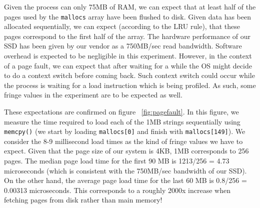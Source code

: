 Given the process can only 75MB of RAM, we can expect that at least half of the pages used by the \texttt{mallocs} array have been flushed to disk. Given data has been allocated sequentially, we can expect (according to the LRU rule), that these pages correspond to the first half of the array. The hardware performance of our SSD has been given by our vendor as a 750MB/sec read bandwidth. Software overhead is expected to be negligible in this experiment. However, in the context of a page fault, we can expect that after waiting for a while the OS might decide to do a context switch before coming back. Such context switch could occur while the process is waiting for a load instruction which is being profiled. As such, some fringe values in the experiment are to be expected as well.

These expectations are confirmed on figure ~\ref{fig:pagefault}. In this figure, we measure the time required to load each of the 1MB strings sequentially using \texttt{memcpy()} (we start by loading \texttt{mallocs[0]} and finish with \texttt{mallocs[149]}). We consider the 8-9 millisecond load times as the kind of fringe values we have to expect.
Given that the page size of our system is 4KB, 1MB corresponds to 256 pages. The median page load time for the first 90 MB is 1213/256 = 4.73  microseconds (which is consistent with the 750MB/sec bandwidth of our SSD). On the other hand, the average page load time for the last 60 MB is 0.8/256 = 0.00313  microseconds. This corresponds to a roughly 2000x increase when fetching pages from disk rather than main memory!

